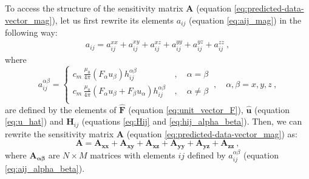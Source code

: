 \documentclass[manuscript,noblind]{geophysics}
\begin{document}
To access the structure of the sensitivity matrix $\mathbf{A}$ 
(equation \ref{eq:predicted-data-vector_mag}), let us first rewrite its elements 
$a_{ij}$ (equation \ref{eq:aij_mag}) in the following way:
\begin{equation}
	\begin{split}
		a_{ij} = a^{xx}_{ij} + a^{xy}_{ij} + a^{xz}_{ij} + a^{yy}_{ij} + a^{yz}_{ij} + a^{zz}_{ij} \: ,
	\end{split}
	\label{eq:aij_mag_expand}
\end{equation}
where
\begin{equation}
	a^{\alpha\beta}_{ij} = 
	\begin{cases}
		c_{m} \, \frac{\mu_{0}}{4\pi} 
		\left( F_{\alpha} u_{\beta} \right) h^{\alpha\beta}_{ij} \: &, \quad \alpha = \beta \\
		c_{m} \, \frac{\mu_{0}}{4\pi} 
		\left( F_{\alpha} u_{\beta} + F_{\beta} u_{\alpha} \right) h^{\alpha\beta}_{ij} \: &, \quad \alpha \ne \beta \\
	\end{cases}
	\: , \quad \alpha, \beta = x, y, z \: ,
	\label{eq:aij_alpha_beta}
\end{equation}
are defined by the elements of $\hat{\mathbf{F}}$ 
(equation \ref{eq:unit_vector_F}), $\hat{\mathbf{u}}$ (equation \ref{eq:u_hat}) and 
$\mathbf{H}_{ij}$ (equations \ref{eq:Hij} and \ref{eq:hij_alpha_beta}).
Then, we can rewrite the sensitivity matrix $\mathbf{A}$ 
(equation \ref{eq:predicted-data-vector_mag}) as:
\begin{equation}
	\mathbf{A} = \mathbf{A_{xx}} + \mathbf{A_{xy}} + \mathbf{A_{xz}} + 
	\mathbf{A_{yy}} + \mathbf{A_{yz}} + \mathbf{A_{zz}} \: ,
	\label{eq:A_expand}
\end{equation}
where $\mathbf{A_{\boldsymbol{\alpha\beta}}}$ are $N \times M$ matrices with elements 
$ij$ defined by $a^{\alpha\beta}_{ij}$ (equation \ref{eq:aij_alpha_beta}).
\end{document}

